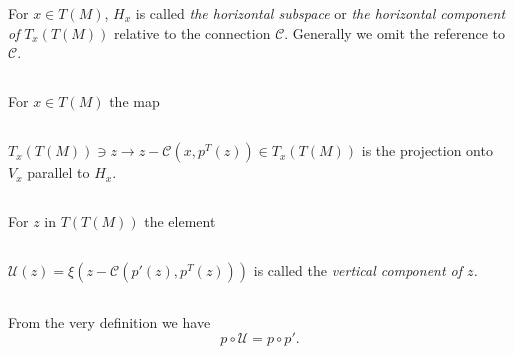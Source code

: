 \begin{defi*}
For $x\in T(M)$, $H_{x}$ is called {\em the horizontal subspace} or
{\em the horizontal component of} $T_{x}(T(M))$ relative to the
connection $\mathcal{C}$. Generally we omit the reference to
$\mathcal{C}$.
\end{defi*}

\subsection{}\label{chap2:2.1.8}

\begin{defi*}
For \pageoriginale $x\in T(M)$ the map
\end{defi*}

\setcounter{subsection}{8}
\subsection{}\label{chap2:2.1.9}

$T_{x}(T(M))\ni z\to z-\mathcal{C}(x,p^{T}(z))\in T_{x}(T(M))$ is the
projection onto $V_{x}$ parallel to $H_{x}$.

\subsection{}\label{chap2:2.1.10}

\begin{defi*}
For $z$ in $T(T(M))$ the element
\end{defi*}

\setcounter{subsection}{10}

\subsection{}\label{chap2:2.1.11}

$\mathscr{U}(z)=\xi (z-\mathcal{C}(p'(z),p^{T}(z)))$ is called the
           {\em vertical component of $z$.}

\subsection{}\label{chap2:2.1.12}

\begin{note*}
From the very definition we have
$$
p\circ \mathscr{U}=p\circ p'.
$$
\end{note*}


\subsection{}\label{chap2:2.1.13}

